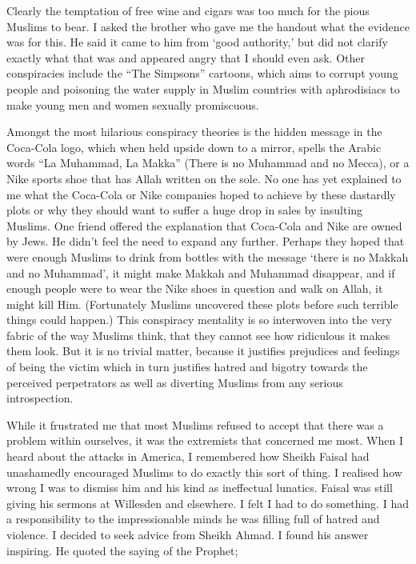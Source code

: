 \documentclass[12pt]{memoir}
\begin{document}
Clearly the temptation of free wine and cigars
was too much for the pious Muslims to bear.
I asked the brother who gave me the handout what the evidence was for this.
He said it came to him from ‘good authority,’
but did not clarify exactly what that was
and appeared angry that I should even ask.
Other conspiracies include the “The Simpsons” cartoons,
which aims to corrupt young people and poisoning the water supply
in Muslim countries with aphrodisiacs
to make young men and women sexually promiscuous.

Amongst the most hilarious conspiracy theories
is the hidden message in the Coca-Cola logo,
which when held upside down to a mirror,
spells the Arabic words “La Muhammad, La Makka”
(There is no Muhammad and no Mecca),
or a Nike sports shoe that has Allah written on the sole.
No one has yet explained to me what the Coca-Cola or Nike companies
hoped to achieve by these dastardly plots
or why they should want to suffer a huge drop in sales by insulting Muslims.
One friend offered the explanation that Coca-Cola and Nike are owned by Jews.
He didn’t feel the need to expand any further.
Perhaps they hoped that were enough Muslims to drink from bottles
with the message ‘there is no Makkah and no Muhammad’,
it might make Makkah and Muhammad disappear,
and if enough people were to wear the Nike shoes
in question and walk on Allah, it might kill Him.
(Fortunately Muslims uncovered these plots
before such terrible things could happen.)
This conspiracy mentality is so interwoven
into the very fabric of the way Muslims think,
that they cannot see how ridiculous it makes them look.
But it is no trivial matter, because it justifies prejudices and feelings
of being the victim which in turn justifies hatred and bigotry
towards the perceived perpetrators as well as diverting Muslims
from any serious introspection.

While it frustrated me that most Muslims refused to accept
that there was a problem within ourselves,
it was the extremists that concerned me most.
When I heard about the attacks in America,
I remembered how Sheikh Faisal had unashamedly encouraged Muslims
to do exactly this sort of thing.
I realised how wrong I was to dismiss him
and his kind as ineffectual lunatics.
Faisal was still giving his sermons at Willesden and elsewhere.
I felt I had to do something.
I had a responsibility to the impressionable minds
he was filling full of hatred and violence.
I decided to seek advice from Sheikh Ahmad.
I found his answer inspiring.
He quoted the saying of the Prophet;
\end{document}

